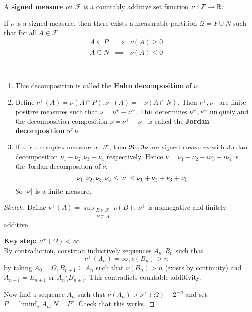 \documentclass{article}
\begin{document}
\begin{defi}
  A {\bf signed measure} on $\mathcal F$ is a countably additive set function $\nu : \mathcal F \rightarrow \mathbb R$.
\end{defi}

\begin{nthm}\label{thm:hahn-decomp}
  If $\nu$ is a signed measure, then there exists a measurable partition $\Omega = P \cup N$ such that for all $A \in \mathcal F$
  \begin{eqnarray*}
    A \subseteq P & \implies & \nu(A) \ge 0 \\
    A \subseteq N & \implies & \nu(A) \le 0
  \end{eqnarray*}
\end{nthm}
\begin{rmks}~
  
  \begin{enumerate}
    \item This decomposition is called the {\bf Hahn decomposition} of $\nu$.
    \item Define $\nu^+(A) = \nu(A \cap P), \nu^-(A) = -\nu(A \cap N)$. Then $\nu^+, \nu^-$ are finite positive measures such that $\nu = \nu^+ - \nu^-$. This determines $\nu^+, \nu^-$ uniquely and the decomposition composition $\nu = \nu^+ - \nu^-$ is called the {\bf Jordan decomposition} of $\nu$.
    \item If $\nu$ is a complex measure on $\mathcal F$, then $\Re\nu, \Im\nu$ are signed measures with Jordan decomposition $\nu_1 - \nu_2, \nu_3 - \nu_4$ respectively. Hence $\nu = \nu_1 - \nu_2 + i\nu_3 - i\nu_4$ is the Jordan decomposition of $\nu$.
    $$\nu_1, \nu_2, \nu_3, \nu_4 \le \left\lvert \nu\right\rvert \le \nu_1 + \nu_2 + \nu_3 + \nu_4$$
    So $\left\lvert \nu\right\rvert$ is a finite measure.
  \end{enumerate}
\end{rmks}
\begin{proof}[Sketch]
  Define $\nu^+(A) = \sup_{\substack{B \in \mathcal F \\ B \subseteq A}} \nu(B)$. $\nu^+$ is nonnegative and finitely additive.

  {\bf Key step: $\nu^+(\Omega) < \infty$} \\
  By contradiction, construct inductively sequences $A_n, B_n$ such that
  $$\nu^+(A_n) = \infty, \nu(B_n) > n$$
  by taking $A_0 = \Omega, B_{n + 1} \subseteq A_n$ such that $\nu(B_n) > n$ (exists by continuity) and $A_{n + 1} = B_{n + 1}$ or $A_n \setminus B_{n + 1}$. This contradicts countable additivity.

  Now find a sequence $A_n$ such that $\nu(A_n) > \nu^+(\Omega) - 2^{-n}$ and set $P = \liminf_n A_n, N = P^c$. Check that this works.
\end{proof}

\newlec

\printindex
\end{document}
